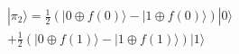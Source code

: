 \documentclass[preview]{standalone}
\begin{document}
\begin{align*}
|\pi_2\rangle = \frac{1}{2} ( |0 \oplus f(0) \rangle - |1 \oplus f(0) \rangle ) |0\rangle \\ + \frac{1}{2}( |0\oplus f(1) \rangle - |1 \oplus f(1) \rangle )|1\rangle
\end{align*}
\end{document}
